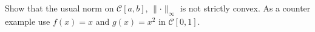 \begin{problem}
Show that the usual norm on $\mathcal{C}[a,b]$, $\lVert\cdot\rVert_{\infty}$ is not strictly convex. As a counter example use $f(x) = x$ and $g(x) = x^2$ in $\mathcal{C}[0,1]$.
\end{problem}

\begin{solution}

\end{solution}

